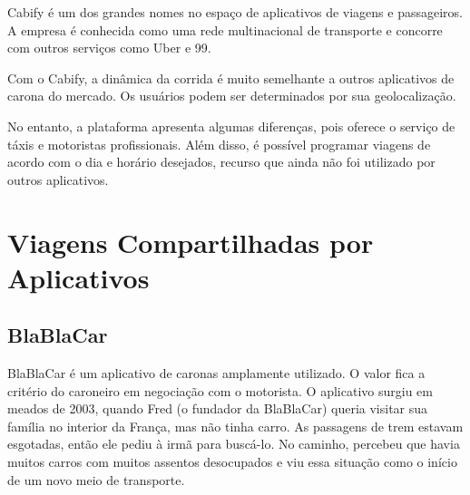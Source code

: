 Cabify é um dos grandes nomes no espaço de aplicativos de viagens e passageiros. A empresa é conhecida como uma rede multinacional de transporte e concorre com outros serviços como Uber e 99.

Com o Cabify, a dinâmica da corrida é muito semelhante a outros aplicativos de carona do mercado. Os usuários podem ser determinados por sua geolocalização.

No entanto, a plataforma apresenta algumas diferenças, pois oferece o serviço de táxis e motoristas profissionais. Além disso, é possível programar viagens de acordo com o dia e horário desejados, recurso que ainda não foi utilizado por outros aplicativos.


\section{Viagens Compartilhadas por Aplicativos}
\subsection{BlaBlaCar}

BlaBlaCar é um aplicativo de caronas amplamente utilizado. O valor fica a critério do caroneiro em negociação com o motorista. O aplicativo surgiu em meados de 2003, quando Fred (o fundador da BlaBlaCar) queria visitar sua família no interior da França, mas não tinha carro. As passagens de trem estavam esgotadas, então ele pediu à irmã para buscá-lo. No caminho, percebeu que havia muitos carros com muitos assentos desocupados e viu essa situação como o início de um novo meio de transporte.

